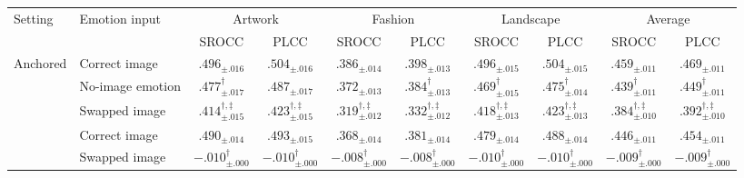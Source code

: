 \begin{tabular}{ll cc cc cc cc}
\toprule
\multirow{2}{*}{Setting} & \multirow{2}{*}{Emotion input} & \multicolumn{2}{c}{Artwork} & \multicolumn{2}{c}{Fashion} & \multicolumn{2}{c}{Landscape} & \multicolumn{2}{c}{Average} \\
\cmidrule(lr){3-4}\cmidrule(lr){5-6}\cmidrule(lr){7-8}\cmidrule(lr){9-10}
& & SROCC & PLCC & SROCC & PLCC & SROCC & PLCC & SROCC & PLCC \\
\midrule
\multirow{3}{*}{Anchored} & Correct image & $\bm{.496_{\pm .016}}$ & $\bm{.504_{\pm .016}}$ & $\bm{.386_{\pm .014}}$ & $\bm{.398_{\pm .013}}$ & $\bm{.496_{\pm .015}}$ & $\bm{.504_{\pm .015}}$ & $\bm{.459_{\pm .011}}$ & $\bm{.469_{\pm .011}}$ \\
& No-image emotion & $.477_{\pm .017}^{\dagger}$ & $.487_{\pm .017}$ & $.372_{\pm .013}$ & $.384_{\pm .013}^{\dagger}$ & $.469_{\pm .015}^{\dagger}$ & $.475_{\pm .014}^{\dagger}$ & $.439_{\pm .011}^{\dagger}$ & $.449_{\pm .011}^{\dagger}$ \\
& Swapped image & $.414_{\pm .015}^{\dagger,\ddagger}$ & $.423_{\pm .015}^{\dagger,\ddagger}$ & $.319_{\pm .012}^{\dagger,\ddagger}$ & $.332_{\pm .012}^{\dagger,\ddagger}$ & $.418_{\pm .013}^{\dagger,\ddagger}$ & $.423_{\pm .013}^{\dagger,\ddagger}$ & $.384_{\pm .010}^{\dagger,\ddagger}$ & $.392_{\pm .010}^{\dagger,\ddagger}$ \\
\addlinespace
\multirow{2}{*}{Unanchored} & Correct image & $\bm{.490_{\pm .014}}$ & $\bm{.493_{\pm .015}}$ & $\bm{.368_{\pm .014}}$ & $\bm{.381_{\pm .014}}$ & $\bm{.479_{\pm .014}}$ & $\bm{.488_{\pm .014}}$ & $\bm{.446_{\pm .011}}$ & $\bm{.454_{\pm .011}}$ \\
& Swapped image & $-.010_{\pm .000}^{\dagger}$ & $-.010_{\pm .000}^{\dagger}$ & $-.008_{\pm .000}^{\dagger}$ & $-.008_{\pm .000}^{\dagger}$ & $-.010_{\pm .000}^{\dagger}$ & $-.010_{\pm .000}^{\dagger}$ & $-.009_{\pm .000}^{\dagger}$ & $-.009_{\pm .000}^{\dagger}$ \\
\bottomrule
\end{tabular}
